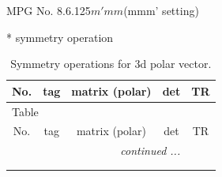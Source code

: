 \documentclass[fleqn,8pt]{jsarticle}
\begin{document}
\setcounter{MaxMatrixCols}{32}

\renewcommand{\tablename}{Table~}
\renewcommand{\figurename}{Figure~}
\begin{center}
\LARGE
MPG No. 8.6.125\quad$m'mm$\quad(mmm' setting)
\end{center}
* symmetry operation
\renewcommand{\arraystretch}{1.3}
\begin{longtable}{ccccc}
\caption{Symmetry operations for 3d polar vector.}
 \\
 \hline \hline
No. & tag & matrix (polar) & det & TR \\ \hline \endfirsthead

\multicolumn{4}{l}{\tablename\ \thetable{}} \\
 \hline \hline
No. & tag & matrix (polar) & det & TR \\ \hline \endhead

 \hline \hline
\multicolumn{4}{r}{\footnotesize\it continued ...} \\ \endfoot

 \hline \hline
\multicolumn{4}{r}{} \\ \endlastfoot


\end{longtable}
\end{document}
